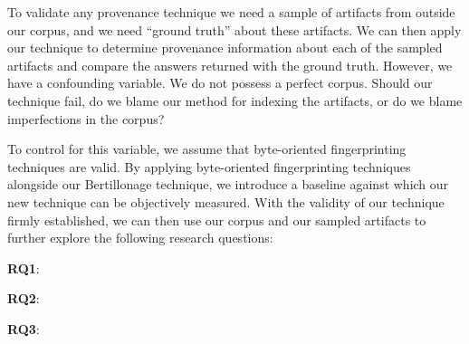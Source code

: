 \label{sec:evaluation}

\label{sec:method}

To validate any provenance technique we need a sample of artifacts from
outside our corpus, and we need ``ground truth'' about these artifacts.  We
can then apply our technique to determine provenance information about each
of the sampled artifacts and compare the answers returned with the ground
truth.  However, we have a confounding variable.  We do not possess a
perfect corpus.  Should our technique fail, do we blame our method for
indexing the artifacts, or do we blame imperfections in the corpus?

To control for this variable, we assume that byte-oriented fingerprinting
techniques are valid.  By applying byte-oriented fingerprinting techniques
alongside our Bertillonage technique, we introduce a baseline against which
our new technique can be objectively measured.  With the validity of our
technique firmly established, we can then use our corpus and our sampled
artifacts to further explore the following research questions:


\vspace{0.7em}

\textbf{RQ1}: \textbf{\rqOne}


\vspace{0.7em}

\textbf{RQ2}: \textbf{\rqTwo}


\vspace{0.7em}

\textbf{RQ3}: \textbf{\rqThree}





